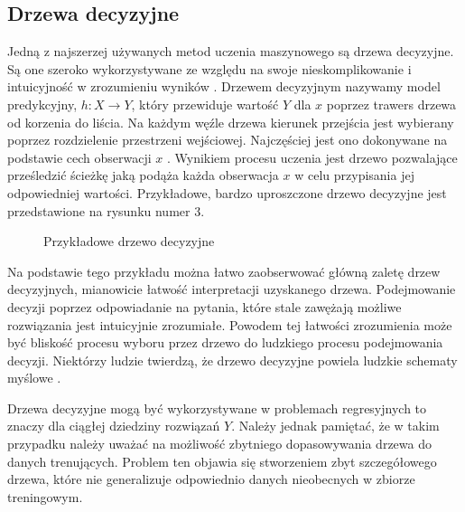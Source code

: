 \documentclass[10pt,a4paper]{article}
\begin{document}
\subsection{Drzewa decyzyjne}
Jedną z najszerzej używanych metod uczenia maszynowego są drzewa decyzyjne. Są one szeroko wykorzystywane ze względu na swoje nieskomplikowanie i intuicyjność w zrozumieniu wyników \cite{wu2008top}. Drzewem decyzyjnym nazywamy model predykcyjny, $h: X \rightarrow Y$, który przewiduje wartość $Y$ dla $x$ poprzez trawers drzewa od korzenia do liścia. Na każdym węźle drzewa kierunek przejścia jest wybierany poprzez rozdzielenie przestrzeni wejściowej. Najczęściej jest ono dokonywane na podstawie cech obserwacji $x$ \cite{books/daglib/0033642}. Wynikiem procesu uczenia jest drzewo pozwalające prześledzić ścieżkę jaką podąża każda obserwacja $x$ w celu przypisania jej odpowiedniej wartości. Przykładowe, bardzo uproszczone drzewo decyzyjne jest przedstawione na rysunku numer 3.
\begin{figure}[!ht]
	\centering
	\caption{Przykładowe drzewo decyzyjne}
\end{figure}
\FloatBarrier

Na podstawie tego przykładu można łatwo zaobserwować główną zaletę drzew decyzyjnych, mianowicie łatwość interpretacji uzyskanego drzewa. Podejmowanie decyzji poprzez odpowiadanie na pytania, które stale zawężają możliwe rozwiązania jest intuicyjnie zrozumiałe. Powodem tej łatwości zrozumienia może być bliskość procesu wyboru przez drzewo do ludzkiego procesu podejmowania decyzji. Niektórzy ludzie twierdzą, że drzewo decyzyjne powiela ludzkie schematy myślowe \cite{James2013}. 

Drzewa decyzyjne mogą być wykorzystywane w problemach regresyjnych to znaczy dla ciągłej dziedziny rozwiązań $Y$. Należy jednak pamiętać, że w takim przypadku  należy uważać na możliwość zbytniego dopasowywania drzewa do danych trenujących. Problem ten objawia się stworzeniem zbyt szczegółowego drzewa, które nie generalizuje odpowiednio danych nieobecnych w zbiorze treningowym.
\end{document}
